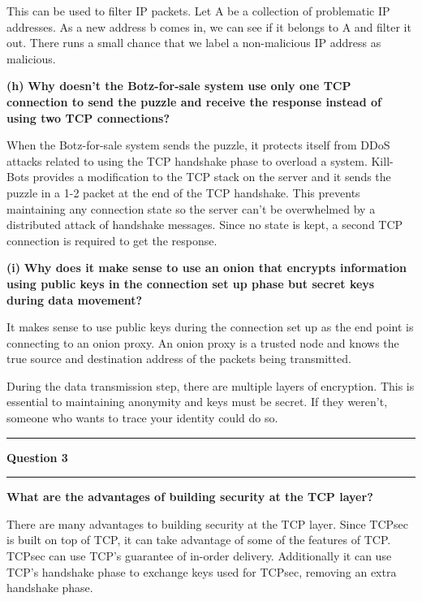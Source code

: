 \documentclass[11pt]{article}
\newcommand\question[2]{\vspace{.25in}\hrule\textbf{#1}\vspace{.5em}\hrule\vspace{.10in}}
\renewcommand\part[1]{\vspace{.10in}\textbf{(#1)}}
\begin{document}
This can be used to filter IP packets. Let A be a collection of problematic IP addresses. As a new address b comes in, we can see if it belongs to A and filter it out. There runs a small chance that we label a non-malicious IP address as malicious.

\part{h} \textbf{Why doesn't the Botz-for-sale system use only one TCP connection to send the puzzle and receive the response instead of using two TCP connections?}

When the Botz-for-sale system sends the puzzle, it protects itself from DDoS attacks related to using the TCP handshake phase to overload a system. Kill-Bots provides a modification to the TCP stack on the server and it sends the puzzle in a 1-2 packet at the end of the TCP handshake. This prevents maintaining any connection state so the server can't be overwhelmed by a distributed attack of handshake messages. Since no state is kept, a second TCP connection is required to get the response.

\part{i} \textbf{Why does it make sense to use an onion that encrypts information using public keys in the connection set up phase but secret keys during data movement?}

It makes sense to use public keys during the connection set up as the end point is connecting to an onion proxy. An onion proxy is a trusted node and knows the true source and destination address of the packets being transmitted.

During the data transmission step, there are multiple layers of encryption. This is essential to maintaining anonymity and keys must be secret. If they weren't, someone who wants to trace your identity could do so. 


\question{Question 3}

\part{1} \textbf{What are the advantages of building security at the TCP layer?}

There are many advantages to building security at the TCP layer. Since TCPsec is built on top of TCP, it can take advantage of some of the features of TCP. TCPsec can use TCP's guarantee of in-order delivery. Additionally it can use TCP's handshake phase to exchange keys used for TCPsec, removing an extra handshake phase. 
\end{document}
